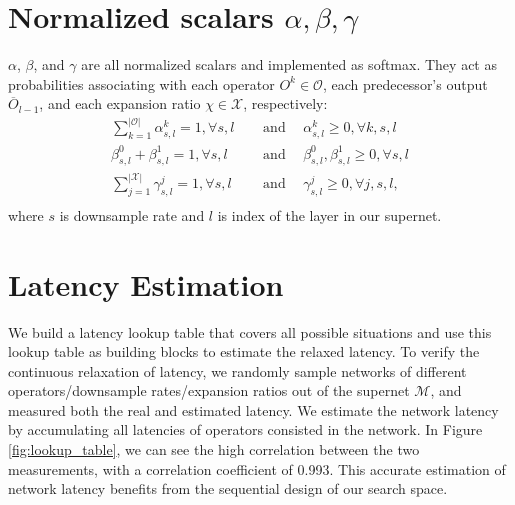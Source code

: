 \documentclass{article} \usepackage{iclr2020_conference,times}
\begin{document}
\section{Normalized scalars $\alpha, \beta, \gamma$}\vspace{-0.7em} \label{app:abc}
$\alpha$, $\beta$, and $\gamma$ are all normalized scalars and implemented as softmax. They act as probabilities associating with each operator $O^k \in \mathcal{O}$, each predecessor's output $\overline{O}_{l-1}$, and each expansion ratio $\chi \in \mathcal{X}$, respectively:
\begin{equation}
\begin{split}
    \sum_{k=1}^{|\mathcal{O}|}\alpha^k_{s, l} = 1, \forall s, l \hspace{15pt} &\mathrm{and} \hspace{15pt} \alpha^k_{s, l} \geq 0, \forall k, s, l \\
    \beta^0_{s, l} + \beta^1_{s, l} = 1, \forall s, l \hspace{15pt} &\mathrm{and} \hspace{15pt} \beta^0_{s, l}, \beta^1_{s, l} \geq 0, \forall s, l \\
    \sum_{j=1}^{|\mathcal{X}|}\gamma^j_{s, l} = 1, \forall s, l  \hspace{15pt} &\mathrm{and} \hspace{15pt} \gamma^j_{s, l} \geq 0, \forall j, s, l, \\
\end{split}
\label{eq:softmax}
\end{equation}
where $s$ is downsample rate and $l$ is index of the layer in our supernet.


\section{Latency Estimation}\vspace{-0.7em} \label{app:latency_estimation}

We build a latency lookup table that covers all possible situations and use this lookup table as building blocks to estimate the relaxed latency. To verify the continuous relaxation of latency, we randomly sample networks of different operators/downsample rates/expansion ratios out of the supernet $\mathcal{M}$, and measured both the real and estimated latency. We estimate the network latency by accumulating all latencies of operators consisted in the network. In Figure \ref{fig:lookup_table}, we can see the high correlation between the two measurements, with a correlation coefficient of 0.993. This accurate estimation of network latency benefits from the sequential design of our search space.
\end{document}
